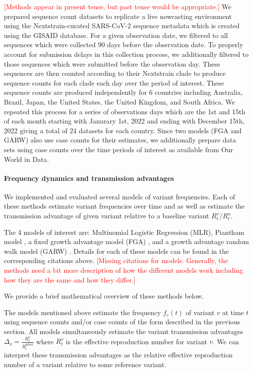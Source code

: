 \documentclass[11pt,oneside,letterpaper]{article}
\def\jhc#1{\textcolor{red}{[#1]}}
\begin{document}
\jhc{Methods appear in present tense, but past tense would be appropriate.}
We prepared sequence count datasets to replicate a live nowcasting environment using the Nextstrain-curated SARS-CoV-2 sequence metadata which is created using the GISAID database.
For a given observation date, we filtered to all sequences which were collected 90 days before the observation date.
To properly account for submission delays in this collection process, we additionally filtered to those sequences which were submitted before the observation day.
These sequences are then counted according to their Nextstrain clade to produce sequence counts for each clade each day over the period of interest.
These sequence counts are produced independently for 6 countries including Australia, Brazil, Japan, the United States, the United Kingdom, and South Africa.
We repeated this process for a series of observations days which are the 1st and 15th of each month starting with  Janurary 1st, 2022 and ending with December 15th, 2022 giving a total of 24 datasets for each country.
Since two models (FGA and GARW) also use case counts for their estimates, we additionally prepare data sets using case counts over the time periods of interest as available from Our World in Data.

\paragraph{Frequency dynamics and transmission advantages}%

We implemented and evaluated several models of variant frequencies.
Each of these methods estimate variant frequencies over time and as well as estimate the transmission advantage of given variant relative to a baseline variant $R_{t}^{v} / R_{t}^{u}$.

The 4 models of interest are: Multinomial Logistic Regression (MLR), Piantham model \cite{piantham2021estimating}, a fixed growth advantage model (FGA)  \cite{figgins2022sars}, and a growth advantage random walk model (GARW)  \cite{figgins2022sars}.
Details for each of these models can be found in the corresponding citations above.
\jhc{Missing citations for models. Generally, the methods need a bit more description of how the different models work including how they are the same and how they differ.}

We provide a brief mathematical overview of these methods below.

The models mentioned above estimate the frequency  $f_{v}(t)$ of variant $v$ at time $t$ using sequence counts and/or case counts of the form described in the previous section.
All models simultaneously estimate the variant transmission advantages $\Delta_{v} = \frac{R_{t}^{v}}{R_{t}^{\text{pivot}}}$ where $R_{t}^{v}$ is the effective reproduction number for variant $v$.
We can interpret these transmission advantages as the relative effective reproduction number of a variant relative to some reference variant.
\end{document}

